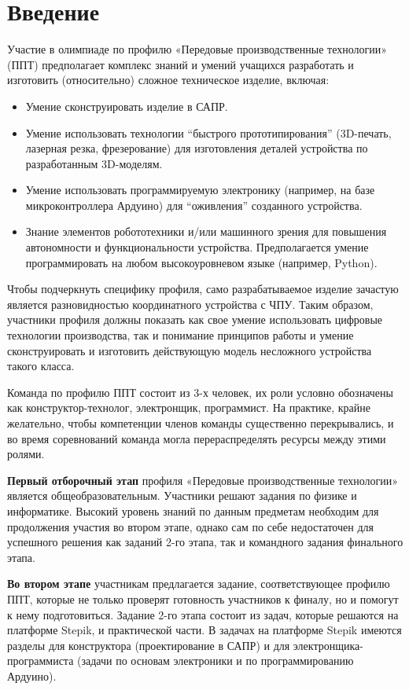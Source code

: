 %
\begingroup
\pagestyle{empty}

\section*{Введение}

Участие в олимпиаде по профилю «Передовые производственные технологии» (ППТ) предполагает комплекс знаний и умений учащихся разработать и изготовить (относительно) сложное техническое изделие, включая:
\begin{itemize}
    \item Умение сконструировать изделие в САПР.
    \item Умение использовать технологии “быстрого прототипирования” (3D-печать, лазерная резка, фрезерование) для изготовления деталей устройства по разработанным 3D-моделям. 
    \item Умение использовать программируемую электронику (например, на базе микроконтроллера Ардуино) для “оживления” созданного устройства.
    \item Знание элементов робототехники и/или машинного зрения для повышения автономности и функциональности устройства.  Предполагается умение программировать на любом высокоуровневом языке (например, Python).
\end{itemize}

Чтобы подчеркнуть специфику профиля, само разрабатываемое изделие зачастую является разновидностью координатного устройства с ЧПУ.  Таким образом, участники профиля должны показать как свое умение использовать цифровые технологии производства, так и понимание принципов работы и умение сконструировать и изготовить действующую модель несложного устройства такого класса.

Команда по профилю ППТ состоит из 3-х человек, их роли условно обозначены как конструктор-технолог, электронщик, программист.  На практике, крайне желательно, чтобы компетенции членов команды существенно перекрывались, и во время соревнований команда могла перераспределять ресурсы между этими ролями.

\textbf{Первый отборочный этап} профиля «Передовые производственные технологии» является общеобразовательным. Участники решают задания по физике и информатике. Высокий уровень знаний по данным предметам необходим для продолжения участия во втором этапе, однако сам по себе недостаточен для успешного решения как заданий 2-го этапа, так и командного задания финального этапа. 

\textbf{Во втором этапе} участникам предлагается задание, соответствующее профилю ППТ, которые не только проверят готовность участников к финалу, но и помогут к нему подготовиться. Задание 2-го этапа состоит из задач, которые решаются на платформе Stepik, и практической части. В задачах на платформе Stepik имеются разделы для конструктора (проектирование в САПР) и для электронщика-программиста (задачи по основам электроники и по программированию Ардуино). 

